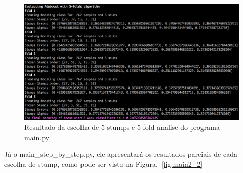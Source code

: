 \begin{figure}[h!]
  \includegraphics[width=\linewidth]{imgs/exemple_output.png}
  \caption{Resultado da escolha de 5 stumps e 5-fold analise do programa main.py}
	\label{fig:main_5}
\end{figure}


Já o main\_step\_by\_step.py, ele apresentará os resultados parciais de cada escolha de stump, como pode ser visto na Figura.~\ref{fig:main2_2}

